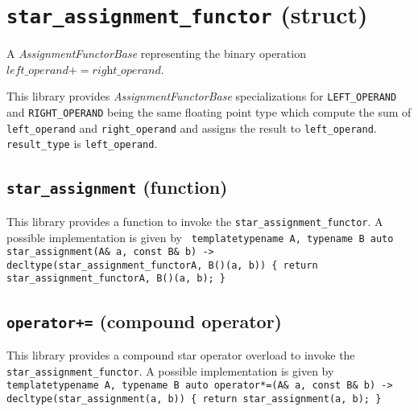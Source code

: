 \section{\texttt{star\_assignment\_functor} (struct)}
A \textit{AssignmentFunctorBase} representing the binary operation $\textit{left\_operand} += \textit{right\_operand}$.\newline

\noindent{}This library provides \textit{AssignmentFunctorBase} specializations for
\texttt{LEFT\_OPERAND} and \texttt{RIGHT\_OPERAND} being the same    floating point
type which compute  the sum of  \texttt{left\_operand} and \texttt{right\_operand}
and assigns the result to \texttt{left\_operand}.
\texttt{result\_type} is \texttt{left\_operand}.

\subsection{\texttt{star\_assignment} (function)}
This library provides a function to invoke the \texttt{star\_assignment\_functor}.
A possible implementation is given by\newline
\texttt{
template\textlangle typename A, typename B\textrangle\newline
auto star\_assignment(A\& a, const B\& b) -> decltype(star\_assignment\_functor\textlangle A, B\textrangle()(a, b))\newline
\{ return star\_assignment\_functor\textlangle A, B\textrangle()(a, b); \}
}

\subsection{\texttt{operator+=} (compound operator)}
This library provides a compound star operator overload to invoke the \texttt{star\_assignment\_functor}.
A possible implementation is given by\newline
\texttt{
template\textlangle typename A, typename B\textrangle\newline
auto operator*=(A\& a, const B\& b) -> decltype(star\_assignment(a, b))\newline
\{ return star\_assignment(a, b); \}
}